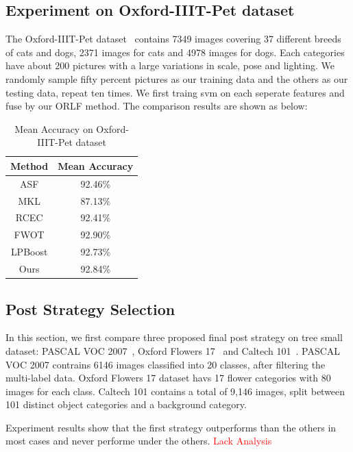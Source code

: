 \documentclass[letterpaper]{article}
\def\yanred{\textcolor{red}}
\begin{document}
\subsection{Experiment on Oxford-IIIT-Pet dataset}
The Oxford-IIIT-Pet dataset~\cite{parkhi12a} contains 7349 images covering 37 different breeds of cats and dogs, 2371 images for cats and 4978 images for dogs. Each categories have about 200 pictures with a large variations in scale, pose and lighting.
We randomly sample fifty percent pictures as our training data and the others as our testing data, repeat ten times. We first traing svm on each seperate features and fuse by our ORLF method. The comparison results are shown as below:

\begin{table}[h]\small
\centering
\label{table:oxford_pet}
\begin{tabular}{c|c}
\hline
Method                       & Mean Accuracy     \\\hline
ASF                          & 92.46\%           \\
MKL                          & 87.13\%           \\
RCEC                         & 92.41\%           \\
FWOT                         & 92.90\%           \\
LPBoost                      & 92.73\%           \\\hline
Ours                         & 92.84\%           \\
\hline
\end{tabular}
\caption{Mean Accuracy on Oxford-IIIT-Pet dataset}
\end{table}



\subsection{Post Strategy Selection}
In this section, we first compare three proposed final post strategy on tree small dataset: PASCAL VOC 2007~\cite{pascal-voc-2007}, Oxford Flowers 17~\cite{nilsback2006visual} and Caltech 101~\cite{Li2006One}. PASCAL VOC 2007 contrains 6146 images classified into 20 classes, after filtering the multi-label data. Oxford Flowers 17 dataset havs 17 flower categories with 80 images for each class. Caltech 101 contains a total of 9,146 images, split between 101 distinct object categories and a background category.

Experiment results show that the first strategy outperforms than the others in most cases and never performe under the others. \yanred{Lack Analysis}
\end{document}

